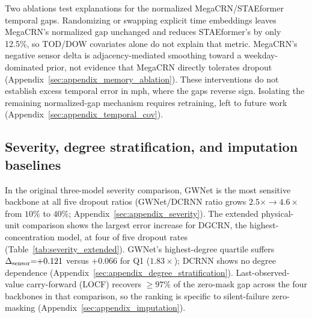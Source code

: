 Two ablations test explanations for the normalized MegaCRN/STAEformer temporal gaps.
Randomizing or swapping explicit time embeddings leaves MegaCRN's normalized gap
unchanged and reduces STAEformer's by only 12.5\%, so TOD/DOW covariates alone
do not explain that metric. MegaCRN's negative sensor delta is adjacency-mediated
smoothing toward a weekday-dominated prior, not evidence that MegaCRN directly
tolerates dropout (Appendix~\ref{sec:appendix_memory_ablation}). These
interventions do not establish excess temporal error in mph, where the gaps
reverse sign. Isolating the remaining normalized-gap mechanism requires
retraining, left to future work (Appendix~\ref{sec:appendix_temporal_cov}).

\subsection{Severity, degree stratification, and imputation baselines}

In the original three-model severity comparison, GWNet is the most sensitive
backbone at all five dropout ratios
(GWNet/DCRNN ratio grows $2.5\times \to 4.6\times$ from $10\%$ to $40\%$;
Appendix~\ref{sec:appendix_severity}). The extended physical-unit comparison
shows the largest error increase for DGCRN, the highest-concentration model, at four of five dropout rates (Table~\ref{tab:severity_extended}). GWNet's highest-degree quartile suffers
$\Delta_{\text{sensor}}{=}{+}0.121$ versus $+0.066$ for Q1 ($1.83\times$); DCRNN shows
no degree dependence (Appendix~\ref{sec:appendix_degree_stratification}).
Last-observed-value carry-forward (LOCF) recovers ${\geq}97\%$ of the zero-mask
gap across the four backbones in that comparison, so the ranking is specific to silent-failure zero-masking
(Appendix~\ref{sec:appendix_imputation}).
